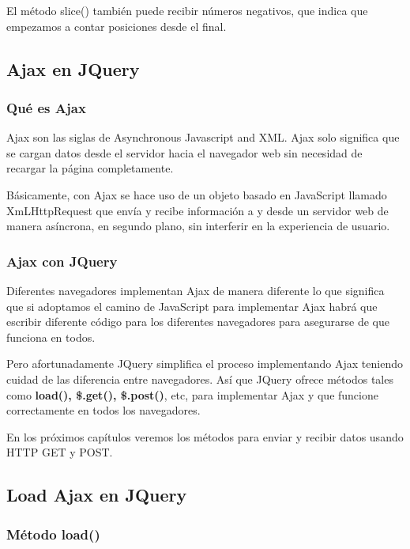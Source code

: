 \documentclass[a4paper, oneside]{article}
\begin{document}
El método slice() también puede recibir números negativos, que indica que empezamos a contar posiciones desde el final.

\subsection{Ajax en JQuery}
\label{sec:org6be5637}

\subsubsection{Qué es Ajax}
\label{sec:org2aeb402}

Ajax son las siglas de Asynchronous Javascript and XML. Ajax solo significa que se cargan datos desde el servidor hacia el navegador web sin necesidad de recargar la página completamente.

Básicamente, con Ajax se hace uso de un objeto basado en JavaScript llamado XmLHttpRequest que envía y recibe información a y desde un servidor web de manera asíncrona, en segundo plano, sin interferir en la experiencia de usuario.

\subsubsection{Ajax con JQuery}
\label{sec:org300b0ee}

Diferentes navegadores implementan Ajax de manera diferente lo que significa que si adoptamos el camino de JavaScript para implementar Ajax habrá que escribir diferente código para los diferentes navegadores para asegurarse de que funciona en todos. 

Pero afortunadamente JQuery simplifica el proceso implementando Ajax teniendo cuidad de las diferencia entre navegadores. Así que JQuery ofrece métodos tales como \textbf{load(), \$.get(), \$.post()}, etc, para implementar Ajax y que funcione correctamente en todos los navegadores.

En los próximos capítulos veremos los métodos para enviar y recibir datos usando HTTP GET y POST.

\subsection{Load Ajax en JQuery}
\label{sec:orgb003862}

\subsubsection{Método load()}
\label{sec:orgda65b50}
\end{document}
